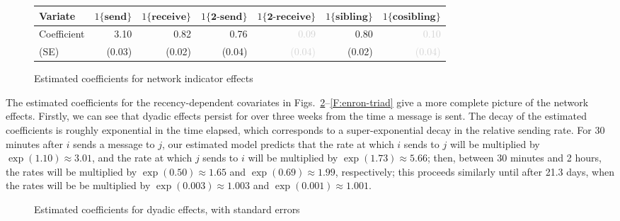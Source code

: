 \documentclass[final]{statsoc}
\begin{document}
\begin{figure}
\centering
\footnotesize
\begin{tabular}{lrrrrrr}
\toprule
Variate
& $1\{\textbf{send}\}$
& $1\{\textbf{receive}\}$
& $1\{\textbf{2-send}\}$
& $1\{\textbf{2-receive}\}$
& $1\{\textbf{sibling}\}$
& $1\{\textbf{cosibling}\}$
\\
\midrule
Coefficient
& 3.10
& 0.82
& 0.76
& \textcolor{LightGray}{0.09}
& 0.80
& \textcolor{LightGray}{0.10}
\\
(SE)
& \tiny{(0.03)}
& \tiny{(0.02)}
& \tiny{(0.04)}
& \textcolor{LightGray}{\tiny{(0.04)}}
& \tiny{(0.02)}
& \textcolor{LightGray}{\tiny{(0.04)}}
\\
\bottomrule
\end{tabular}
\normalsize
\caption{Estimated coefficients for network indicator effects}
\label{F:enron-net-indicator}
\end{figure}

The estimated coefficients for the recency-dependent covariates in
Figs.~\ref{F:enron-dyad}--\ref{F:enron-triad} give a more complete
picture of the network effects.  Firstly, we can see that dyadic effects
persist for over three weeks from the time a message is sent.  The decay of
the estimated coefficients is roughly exponential in the time elapsed, which
corresponds to a super-exponential decay in the relative sending rate.  For 30
minutes after $i$ sends a message to $j$, our estimated model predicts that
the rate at which $i$ sends to $j$ will be multiplied by $\exp(1.10) \approx
3.01$, and the rate at which $j$ sends to $i$ will be multiplied by $\exp(1.73)
\approx 5.66$; then, between 30 minutes and 2 hours, the rates will be
multiplied by $\exp(0.50) \approx 1.65$ and $\exp(0.69) \approx 1.99$,
respectively; this proceeds similarly until after 21.3 days, when the rates
will be be multiplied by $\exp(0.003) \approx 1.003$ and $\exp(0.001) \approx
1.001$.
\begin{figure}
  \centering
  \caption{Estimated coefficients for dyadic effects, with standard errors}
  \label{F:enron-dyad}
\end{figure}
\end{document}

